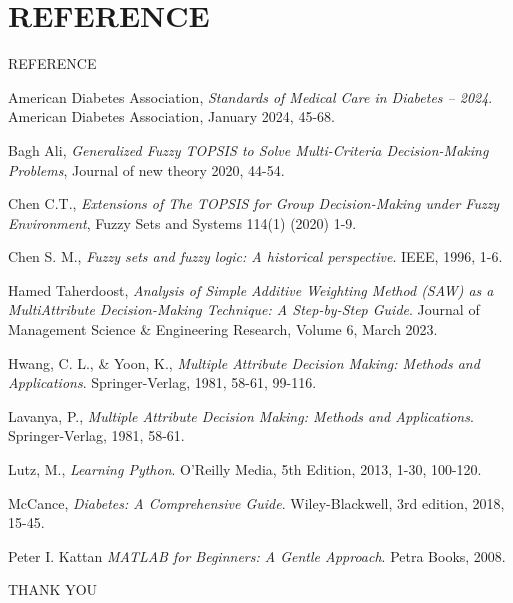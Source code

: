 \documentclass[serif, aspectratio=169]{beamer}
\newtheorem{thm co}{Theorem contd...}
\begin{document}
\section{REFERENCE}
 \begin{frame}{REFERENCE}
\begin{itemize}

\bibitem{}
American Diabetes Association,
\textit{Standards of Medical Care in Diabetes – 2024}.
American Diabetes Association, January 2024, 45-68.

\bibitem{}
Bagh Ali,
\textit{Generalized Fuzzy TOPSIS to Solve Multi-Criteria Decision-Making Problems}, Journal of new theory 2020, 44-54.

\bibitem{}
Chen C.T., 
\textit{Extensions of The TOPSIS for Group Decision-Making under Fuzzy Environment}, Fuzzy Sets and Systems 114(1) (2020) 1-9.

\bibitem{}
Chen S. M., 
\textit{Fuzzy sets and fuzzy logic: A historical perspective}.
IEEE, 1996, 1-6.

\bibitem{}
Hamed Taherdoost, 
\textit{Analysis of Simple Additive Weighting Method (SAW) as a MultiAttribute Decision-Making Technique: A Step-by-Step Guide}.
Journal of Management Science \& Engineering Research, Volume 6, March 2023.


 \end{itemize}
 \end{frame}


\begin{frame}
\begin{itemize}
\bibitem{}
Hwang, C. L., \& Yoon, K., 
\textit{Multiple Attribute Decision Making: Methods and Applications}.
Springer-Verlag, 1981, 58-61, 99-116.

\bibitem{}
Lavanya, P., 
\textit{Multiple Attribute Decision Making: Methods and Applications}.
Springer-Verlag, 1981, 58-61.

\bibitem{}
Lutz, M., 
\textit{Learning Python}.
O'Reilly Media, 5th Edition, 2013, 1-30, 100-120.

\bibitem{}
McCance, 
\textit{Diabetes: A Comprehensive Guide}.
Wiley-Blackwell, 3rd edition, 2018, 15-45.

\bibitem{}
 Peter I. Kattan
\textit{MATLAB for Beginners: A Gentle Approach}.
Petra Books, 2008.


\end{itemize}     
 \end{frame}

 
\begin{frame}
\begin{center}
       {\Huge THANK YOU} 
\end{center} 
\end{frame}
\end{document}
